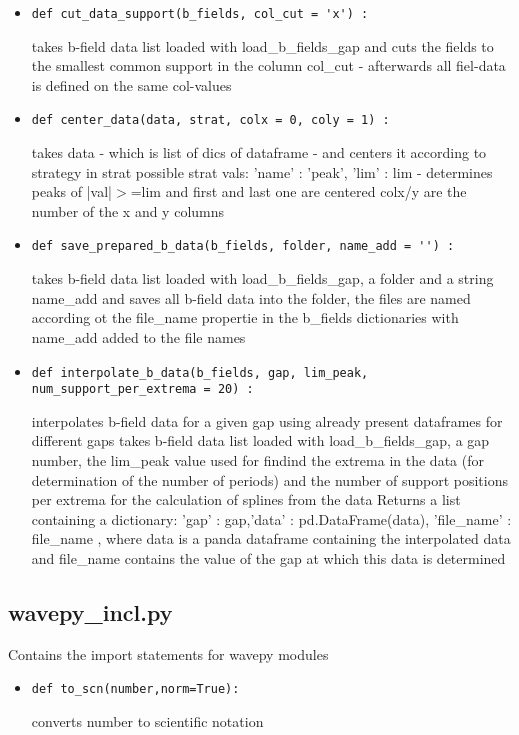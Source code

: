 \documentclass[
12pt,%
a4paper,  %
twoside        %
]{report}
\begin{document}
\begin{landscape}
\begin{itemize}
\item \begin{verbatim}
def cut_data_support(b_fields, col_cut = 'x') :
\end{verbatim}
takes b-field data list loaded with load\_b\_fields\_gap and
cuts the fields to the smallest common support in the column
col\_cut - afterwards all fiel-data is defined on the same col-values
\item \begin{verbatim}
def center_data(data, strat, colx = 0, coly = 1) :
\end{verbatim}
takes data - which is list of dics of dataframe - and centers it according to strategy in strat
possible strat vals:
{ 'name' : 'peak', 'lim' : lim } - determines peaks of |val|$>$=lim and first and last one are centered
colx/y are the number of the x and y columns
\item \begin{verbatim}
def save_prepared_b_data(b_fields, folder, name_add = '') :
\end{verbatim}
takes b-field data list loaded with load\_b\_fields\_gap, a folder and a string name\_add 
and saves all b-field data into the folder, the files are named according ot the 
file\_name propertie in the b\_fields dictionaries with name\_add added to the file names
\item \begin{verbatim}
def interpolate_b_data(b_fields, gap, lim_peak, num_support_per_extrema = 20) :
\end{verbatim}
interpolates b-field data for a given gap using already present dataframes for different gaps
takes b-field data list loaded with load\_b\_fields\_gap, a gap number, the lim\_peak value 
used for findind the extrema in the data (for determination of the number of periods)
and the number of support positions per extrema for the calculation of splines from the data
Returns a list containing a dictionary: { 'gap' : gap,'data' : pd.DataFrame(data), 'file\_name' : file\_name }, where data is a panda dataframe 
containing the interpolated data and file\_name contains the value of the gap at which this data is determined
\end{itemize}
\subsection{wavepy\_incl.py}
Contains the import statements for wavepy modules
\begin{itemize}
\item \begin{verbatim}
def to_scn(number,norm=True):
\end{verbatim}
converts number to scientific notation
\end{itemize}

\end{landscape}
\end{document}
